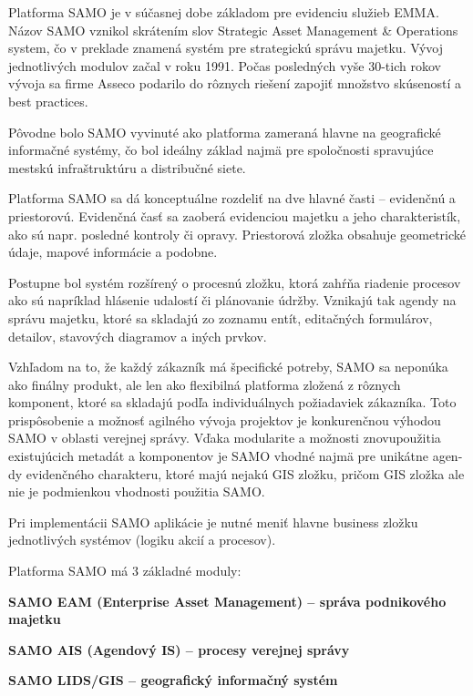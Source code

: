
Platforma SAMO je v súčasnej dobe základom pre evidenciu služieb EMMA. Názov SAMO vznikol skrátením slov Strategic Asset Management \& Operations system, čo v preklade znamená systém pre strategickú správu majetku. Vývoj jednotlivých modulov začal v roku 1991. Počas posledných vyše 30-tich rokov vývoja sa firme Asseco podarilo do rôznych riešení zapojiť množstvo skúseností a best practices.

Pôvodne bolo SAMO vyvinuté ako platforma zameraná hlavne na geografické informačné systémy, čo bol ideálny základ najmä pre spoločnosti spravujúce mestskú infraštruktúru a distribučné siete.

Platforma SAMO sa dá konceptuálne rozdeliť na dve hlavné časti – evidenčnú a priestorovú. Evidenčná časť sa zaoberá evidenciou majetku a jeho charakteristík, ako sú napr. posledné kontroly či opravy. Priestorová zložka obsahuje geometrické údaje, mapové informácie a podobne.

Postupne bol systém rozšírený o procesnú zložku, ktorá zahŕňa riadenie procesov ako sú napríklad hlásenie udalostí či plánovanie údržby. Vznikajú tak agendy na správu majetku, ktoré sa skladajú zo zoznamu entít, editačných formulárov, detailov, stavových diagramov a iných prvkov. 

Vzhľadom na to, že každý zákazník má špecifické potreby, SAMO sa neponúka ako finálny produkt, ale len ako flexibilná platforma zložená z rôznych komponent, ktoré sa skladajú podľa individuálnych požiadaviek zákazníka. Toto prispôsobenie a možnosť agilného vývoja projektov je konkurenčnou výhodou SAMO v oblasti verejnej správy. Vďaka modularite a možnosti znovupoužitia existujúcich metadát a komponentov je SAMO vhodné najmä pre unikátne agen-dy evidenčného charakteru, ktoré majú nejakú GIS zložku, pričom GIS zložka ale nie je podmienkou vhodnosti použitia SAMO. 

Pri implementácii SAMO aplikácie je nutné meniť hlavne business zložku jednotlivých systémov (logiku akcií a procesov).

Platforma SAMO má 3 základné moduly:

\startitemize
\item \start\bf SAMO EAM \stop (Enterprise Asset Management) --  správa podnikového majetku
\item \start\bf SAMO AIS \stop (Agendový IS) -- procesy verejnej správy
\item  \start\bf SAMO LIDS/GIS \stop -- geografický informačný systém
\stopitemize

